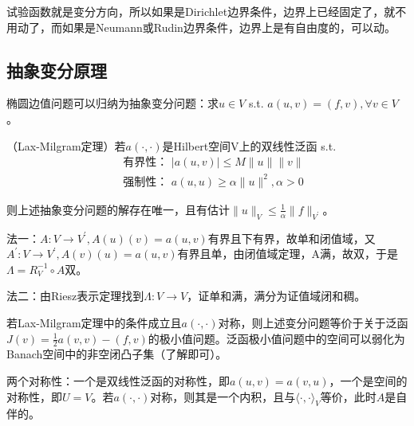 试验函数就是变分方向，所以如果是Dirichlet边界条件，边界上已经固定了，就不用动了，而如果是Neumann或Rudin边界条件，边界上是有自由度的，可以动。

\subsection{抽象变分原理}

椭圆边值问题可以归纳为抽象变分问题：求$u \in V$ s.t. $a(u, v)=(f, v), \forall v \in V$。 

\begin{thm}
  （Lax-Milgram定理）若$a(\cdot, \cdot)$是Hilbert空间V上的双线性泛函 s.t.
  \[
    \begin{aligned}
      &\text{ 有界性： }|a(u, v)| \le M \|u\| \|v\|\\
      &\text{ 强制性： }a(u, u) \ge \alpha \|u\|^2, \alpha > 0
    \end{aligned}
  \]

  则上述抽象变分问题的解存在唯一，且有估计$\|u\|_{V} \le \frac{1}{\alpha} \|f\|_{V^\prime}$。
\end{thm}

\begin{center}
\end{center}

\begin{pf}
  法一：$A: V \to V^\prime, A(u)(v) = a(u, v)$有界且下有界，故单和闭值域，又$A^\prime: V \to V^\prime, A(v)(u) = a(u, v)$有界且单，由闭值域定理，A满，故双，于是$\Lambda = R_V^{-1} \circ A$双。

  法二：由Riesz表示定理找到$\Lambda: V \to V$，证单和满，满分为证值域闭和稠。
\end{pf}

若Lax-Milgram定理中的条件成立且$a(\cdot, \cdot)$对称，则上述变分问题等价于关于泛函$J(v)=\frac{1}{2} a(v, v)-(f, v)$的极小值问题。泛函极小值问题中的空间可以弱化为Banach空间中的非空闭凸子集（了解即可）。

两个对称性：一个是双线性泛函的对称性，即$a(u, v) = a(v, u)$，一个是空间的对称性，即$U = V$。若$a(\cdot, \cdot)$对称，则其是一个内积，且与$\langle \cdot, \cdot \rangle_V$等价，此时$A$是自伴的。

